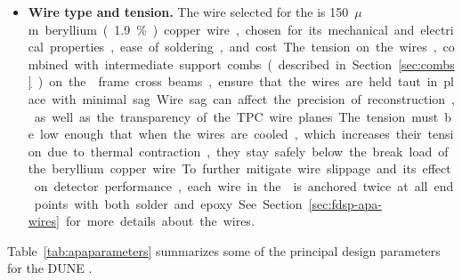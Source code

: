 \begin{itemize}
\item \textbf{Wire type and tension.}  The wire selected for the  is \SI{150}{$\mu$m} beryllium (\num{1.9}\%) copper wire, %
chosen for its mechanical and electrical properties, ease of soldering, and cost.  The tension on the wires, combined with intermediate support combs (described in Section~\ref{sec:combs}) on the  frame cross beams, ensure that the wires are held taut in place with minimal sag.  Wire sag can affect the precision of reconstruction, as well as the transparency of the TPC wire planes.  The tension must be low enough that when the wires are cooled, which increases their tension due to thermal contraction, they stay safely below the break load of the beryllium copper wire.  To further mitigate wire slippage and its effect on detector performance, each wire in the  is anchored twice at all end points with both solder and epoxy.  See Section~\ref{sec:fdsp-apa-wires} for more details about the wires.
\end{itemize}

Table~\ref{tab:apaparameters} summarizes some of the principal design parameters for the DUNE 
.



